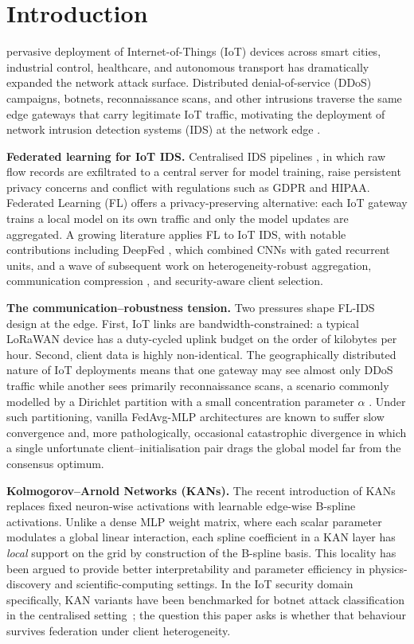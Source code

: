 \section{Introduction}\label{sec:intro}

 pervasive deployment of Internet-of-Things (IoT) devices across smart cities, industrial control, healthcare, and autonomous transport has dramatically expanded the network attack surface. Distributed denial-of-service (DDoS) campaigns, botnets, reconnaissance scans, and other intrusions traverse the same edge gateways that carry legitimate IoT traffic, motivating the deployment of network intrusion detection systems (IDS) at the network edge \cite{nguyen2021fl-iot-survey}.

\textbf{Federated learning for IoT IDS.} Centralised IDS pipelines \cite{10471929}, in which raw flow records are exfiltrated to a central server for model training, raise persistent privacy concerns and conflict with regulations such as GDPR and HIPAA. Federated Learning (FL) \cite{mcmahan2017fedavg, 10468591} offers a privacy-preserving alternative: each IoT gateway trains a local model on its own traffic and only the model updates are aggregated. A growing literature applies FL to IoT IDS, with notable contributions including DeepFed \cite{li2020deepfed}, which combined CNNs with gated recurrent units, and a wave of subsequent work on heterogeneity-robust aggregation, communication compression \cite{sattler2019sparse,reisizadeh2020fedpaq,aji2017topk}, and security-aware client selection.

\textbf{The communication--robustness tension.} Two pressures shape FL-IDS design at the edge. First, IoT links are bandwidth-constrained: a typical LoRaWAN device has a duty-cycled uplink budget on the order of kilobytes per hour. Second, client data is highly non-identical. The geographically distributed nature of IoT deployments means that one gateway may see almost only DDoS traffic while another sees primarily reconnaissance scans, a scenario commonly modelled by a Dirichlet partition with a small concentration parameter $\alpha$ \cite{hsu2019measuring}. Under such partitioning, vanilla FedAvg-MLP architectures are known to suffer slow convergence and, more pathologically, occasional catastrophic divergence in which a single unfortunate client--initialisation pair drags the global model far from the consensus optimum.

\textbf{Kolmogorov--Arnold Networks (KANs).} The recent introduction of KANs \cite{liu2024kan} replaces fixed neuron-wise activations with learnable edge-wise B-spline activations. Unlike a dense MLP weight matrix, where each scalar parameter modulates a global linear interaction, each spline coefficient in a KAN layer has \emph{local} support on the grid by construction of the B-spline basis. This locality has been argued to provide better interpretability and parameter efficiency in physics-discovery and scientific-computing settings. In the IoT security domain specifically, KAN variants have been benchmarked for botnet attack classification in the centralised setting~\cite{10839389}; the question this paper asks is whether that behaviour survives federation under client heterogeneity.

